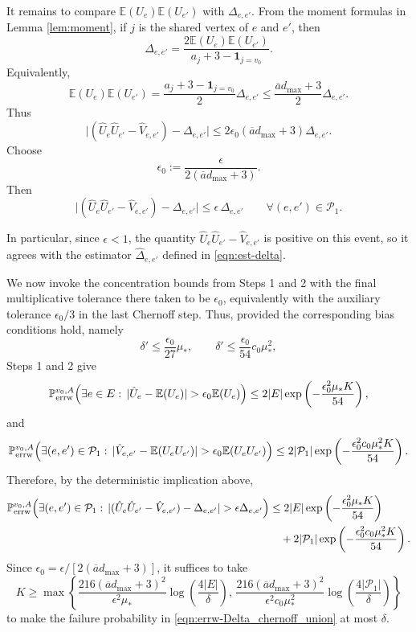 \documentclass[a4paper, 11pt]{article}
\renewcommand{\P}{\mathbb{P}}
\newcommand{\E}{\mathbb{E}}
\newcommand{\Perrw}{\P_{\textnormal{errw}}}
\newcommand{\ind}{\mathbf{1}}
\begin{document}
It remains to compare $\E(U_e)\E(U_{e'})$ with $\Delta_{e,e'}$. From the moment formulas in Lemma \ref{lem:moment}, if $j$ is the shared vertex of $e$ and $e'$, then
\[
\Delta_{e,e'}
=
\frac{2\E(U_e)\E(U_{e'})}{a_j+3-\ind_{j=v_0}}.
\]
Equivalently,
\[
\E(U_e)\E(U_{e'})
=
\frac{a_j+3-\ind_{j=v_0}}{2}\Delta_{e,e'}
\le
\frac{\overline a d_{\max}+3}{2}\Delta_{e,e'}.
\]
Thus
\[
\big|
(\hat U_e\hat U_{e'}-\hat V_{e,e'})
-\Delta_{e,e'}
\big|
\le
2\epsilon_0(\overline a d_{\max}+3)\Delta_{e,e'}.
\]
Choose
\begin{equation}
\label{eqn:errw-eps0-delta-choice}
\epsilon_0:=
\frac{\epsilon}{2(\overline a d_{\max}+3)}.
\end{equation}
Then
\begin{equation}
\label{eqn:errw-delta-good-deterministic}
\big|
(\hat U_e\hat U_{e'}-\hat V_{e,e'})
-\Delta_{e,e'}
\big|
\le
\epsilon\,\Delta_{e,e'}
\qquad
\forall (e,e')\in\mathcal P_1.
\end{equation}

In particular, since \(\epsilon<1\), the quantity
\(\hat U_e\hat U_{e'}-\hat V_{e,e'}\) is positive on this event, so it agrees with the estimator
\(\hat\Delta_{e,e'}\) defined in \cref{eqn:est-delta}.

We now invoke the concentration bounds from Steps 1 and 2 with the final multiplicative tolerance there taken to be \(\epsilon_0\), equivalently with the auxiliary tolerance \(\epsilon_0/3\) in the last Chernoff step. Thus, provided the corresponding bias conditions hold, namely
\[
\delta'\le \frac{\epsilon_0}{27}\mu_*,
\qquad
\delta'\le \frac{\epsilon_0}{54}c_0\mu_*^2,
\]
Steps 1 and 2 give
\[
\Perrw^{v_0,A}\Big(
\exists e\in E:\,
|\hat U_e-\E(U_e)|>\epsilon_0\E(U_e)
\Big)
\le
2|E|\exp\left(-\frac{\epsilon_0^2\mu_*K}{54}\right),
\]
and
\[
\Perrw^{v_0,A}\Big(
\exists (e,e')\in\mathcal P_1:\,
|\hat V_{e,e'}-\E(U_eU_{e'})|>\epsilon_0\E(U_eU_{e'})
\Big)
\le
2|\mathcal P_1|\exp\left(-\frac{\epsilon_0^2c_0\mu_*^2K}{54}\right).
\]
Therefore, by the deterministic implication above,
\begin{align}
\label{eqn:errw-Delta_chernoff_union}
\Perrw^{v_0,A}\Big(
\exists (e,e')\in\mathcal P_1:\,
|(\hat U_e\hat U_{e'}-\hat V_{e,e'})-\Delta_{e,e'}|
>
\epsilon\Delta_{e,e'}
\Big)
&\le
2|E|\exp\left(-\frac{\epsilon_0^2\mu_*K}{54}\right) \nonumber\\
&\quad+
2|\mathcal P_1|\exp\left(-\frac{\epsilon_0^2c_0\mu_*^2K}{54}\right).
\end{align}
Since $\epsilon_0=\epsilon/[2(\overline a d_{\max}+3)]$, it suffices to take
\[
K
\ge
\max\left\{
\frac{216(\overline a d_{\max}+3)^2}{\epsilon^2\mu_*}
\log\left(\frac{4|E|}{\delta}\right),
\,
\frac{216(\overline a d_{\max}+3)^2}{\epsilon^2c_0\mu_*^2}
\log\left(\frac{4|\mathcal P_1|}{\delta}\right)
\right\}
\]
to make the failure probability in \eqref{eqn:errw-Delta_chernoff_union} at most $\delta$.
\end{document}
